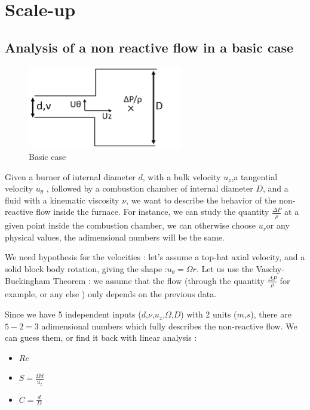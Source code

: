 \renewcommand\evenpagerightmark{{\scshape\small Scale-up}}
\chapter[Scale-up]%
{Scale-up}
\label{Scale-up}

\section{Analysis of a non reactive flow in a basic case}

\begin{figure}[!h]
  \centering
\includegraphics[width=0.6\textwidth]{fig/Schema_Vashy1.png}
  \caption{Basic case}
 \label{Vaschy1}
\end{figure}
Given a burner of internal diameter $d$, with a bulk velocity $u_{z}$,a tangential velocity $u_{\theta}$ ,  followed by a combustion chamber of internal diameter $D$, and a fluid with a kinematic viscosity $\nu$, we want to describe the behavior of the non-reactive flow inside the furnace. For instance, we can study the quantity $\frac{\Delta P}{\rho}$ at a given point inside the combustion chamber, we can otherwise choose $u_{r}$or any physical values, the adimensional numbers will be the same.

We need hypothesis for the velocities : let's assume a top-hat axial velocity, and a solid block body rotation, giving the shape :$u_{\theta}=\Omega r$. Let us use the Vaschy-Buckingham Theorem : we assume that the flow (through the quantity $\frac{\Delta P}{\rho}$ for example, or any else ) only depends on the previous data. 

Since we have 5 independent inputs ($d$,$\nu$,$u_{z}$,$\Omega$,$D$) with 2 units ($m$,$s$), there are $5-2=3$ adimensional numbers which fully describes the non-reactive flow. We can guess them, or find it back with linear analysis :
\begin{itemize}
\item $Re$ 
\item $S=\frac{\Omega d}{u_{z}}$
\item $C=\frac{d}{D}$
\end{itemize}

